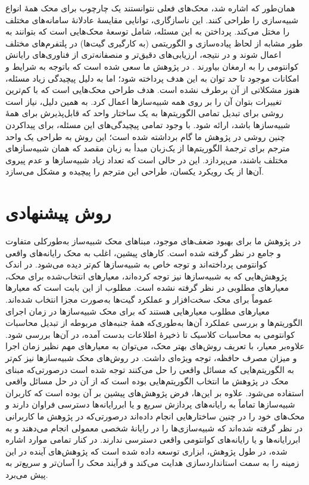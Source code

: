 همان‌طور که اشاره شد، محک‌های فعلی نتوانستند یک چارچوب برای محک همهٔ انواع شبیه‌سازی را طراحی کنند. این ناسازگاری، توانایی مقایسهٔ عادلانهٔ سامانه‌های مختلف را مختل می‌کند. پرداختن به این مسئله، شامل توسعهٔ محک‌هایی است که بتوانند به طور مشابه از لحاظ پیاده‌سازی و الگوریتمی (به کارگیری گیت‌ها) در پلتفرم‌های مختلف اعمال شوند و در نتیجه، ارزیابی‌های دقیق‌تر و منصفانه‌تری از فناوری‌های رایانش کوانتومی را به ارمغان بیاورند
 \cite{lubinski_application-oriented_2023}.
در پژوهش ما سعی شده است که باتوجه‌ به شرایط و امکانات موجود تا حد توان به این هدف پرداخته شود؛ اما به دلیل پیچیدگی زیاد مسئله، هنوز مشکلاتی از آن برطرف نشده است. هدف طراحی محک‌هایی است که با کم‌ترین تغییرات بتوان آن را بر روی همه شبیه‌سازها اعمال کرد. به همین دلیل، نیاز است روشی برای تبدیل تمامی الگوریتم‌ها به یک ساختار واحد که قابل‌پذیرش برای همهٔ شبیه‌سازها باشد، ارائه شود. با وجود تمامی پیچیدگی‌های این مسئله، برای پیداکردن چنین روشی در پژوهش ما گام برداشته شده است؛ این روش به طراحی یک واحد مترجم برای ترجمهٔ الگوریتم‌ها از یک‌زبان مبدأ به زبان مقصد که همان شبیه‌سازهای مختلف باشند، می‌پردازد. این در حالی است که تعداد زیاد شبیه‌سازها و عدم پیروی آن‌ها از یک رویکرد یکسان، طراحی این مترجم را پیچیده و مشکل می‌سازد.

\section{روش پیشنهادی}
در پژوهش ما برای بهبود ضعف‌های موجود، مبناهای محک شبیه‌ساز به‌طورکلی متفاوت و جامع در نظر گرفته شده است. کارهای پیشین، اغلب به محک رایانه‌های واقعی کوانتومی پرداخته‌اند و توجه خاص به شبیه‌سازها کم‌تر دیده می‌شود. در اندک پژوهش‌هایی که به شبیه‌سازها نیز توجه کرده‌اند، معیارهای انتخاب‌شده برای محک، معیارهای مطلوبی در نظر گرفته نشده است. مطلوب از این بابت است که معیارها عموماً برای محک سخت‌افزار و عملکرد گیت‌ها به‌صورت مجزا انتخاب شده‌اند. معیارهای مطلوب معیارهایی هستند که برای محک شبیه‌سازها در زمان اجرای الگوریتم‌ها و بررسی عملکرد آن‌ها به‌طوری‌که همهٔ جنبه‌های مربوطه از تبدیل محاسبات کوانتومی به محاسبات کلاسیک تا ذخیره‌ٔ اطلاعات بدست آمده، در آن‌ها بررسی شود. علاوه‌بر معیار، با تعریف روش‌های بهتر محک، می‌توان به معیارهای مهم نظیر زمان اجرا و میزان مصرف حافظه، توجه ویژه‌ای داشت. در روش‌های محک شبیه‌سازها نیز کم‌تر به الگوریتم‌هایی که مسائل واقعی را حل می‌کنند توجه شده است درصورتی‌که مبنای محک در پژوهش ما انتخاب الگوریتم‌هایی بوده است که از آن در حل مسائل واقعی استفاده می‌شود. علاوه بر این‌ها، فرض پژوهش‌های پیشین بر آن بوده است که کاربران شبیه‌سازها تماماً به رایانه‌های پردازش سریع و یا ابررایانه‌ها دسترسی فراوان دارند و محک‌های خود را در چنین ساختارهایی انجام داده‌اند درصورتی‌که در پژوهش ما کاربرانی در نظر گرفته شده‌اند که شبیه‌سازی‌ها را در رایانهٔ شخصی معمولی انجام می‌دهند و به ابررایانه‌ها و یا رایانه‌های کوانتومی واقعی دسترسی ندارند. در کنار تمامی موارد اشاره شده، در طول پژوهش، ابزاری توسعه داده شده است که پژوهش‌های آینده در این زمینه را به سمت استانداردسازی هدایت می‌کند و فرآیند محک را آسان‌تر و سریع‌تر به پیش می‌برد.

